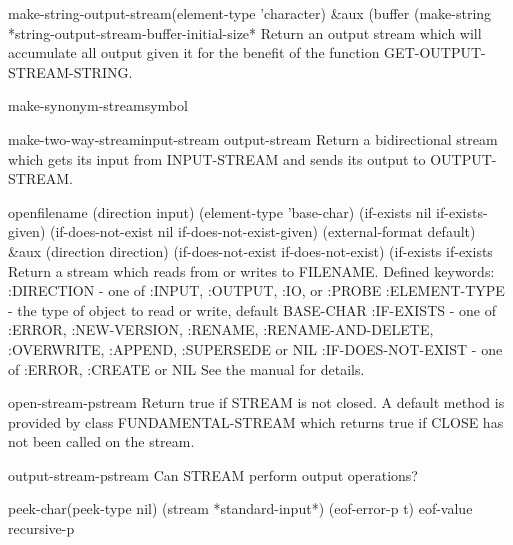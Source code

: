 \begin{function}{make-string-output-stream}{\key (element-type 'character) &aux
 (buffer (make-string *string-output-stream-buffer-initial-size*}{}
  Return an output stream which will accumulate all output given it for the
benefit of the function GET-OUTPUT-STREAM-STRING.
\end{function}

\begin{function}{make-synonym-stream}{symbol}{}
  
\end{function}

\begin{function}{make-two-way-stream}{input-stream output-stream}{}
  Return a bidirectional stream which gets its input from INPUT-STREAM and
   sends its output to OUTPUT-STREAM.
\end{function}

\begin{function}{open}{filename \key (direction input) (element-type 'base-char)
 (if-exists nil if-exists-given)
 (if-does-not-exist nil if-does-not-exist-given) (external-format default) &aux
 (direction direction) (if-does-not-exist if-does-not-exist)
 (if-exists if-exists}{}
  Return a stream which reads from or writes to FILENAME.
  Defined keywords:
   :DIRECTION - one of :INPUT, :OUTPUT, :IO, or :PROBE
   :ELEMENT-TYPE - the type of object to read or write, default BASE-CHAR
   :IF-EXISTS - one of :ERROR, :NEW-VERSION, :RENAME, :RENAME-AND-DELETE,
                       :OVERWRITE, :APPEND, :SUPERSEDE or NIL
   :IF-DOES-NOT-EXIST - one of :ERROR, :CREATE or NIL
  See the manual for details.
\end{function}

\begin{function}{open-stream-p}{stream}{}
  Return true if STREAM is not closed. A default method is provided
  by class FUNDAMENTAL-STREAM which returns true if CLOSE has not been
  called on the stream.
\end{function}

\begin{function}{output-stream-p}{stream}{}
  Can STREAM perform output operations?
\end{function}

\begin{function}{peek-char}{\op (peek-type nil) (stream *standard-input*) (eof-error-p t) eof-value
 recursive-p}{}
  
\end{function}

